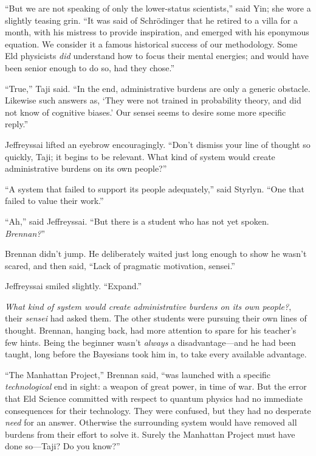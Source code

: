 {
 ``But we are not speaking of only the
lower-status scientists,'' said Yin; she wore a
slightly teasing grin. ``It was said of Schrödinger
that he retired to a villa for a month, with his mistress to provide
inspiration, and emerged with his eponymous equation. We consider it a
famous historical success of our methodology. Some Eld physicists
\textit{did} understand how to focus their mental energies; and would
have been senior enough to do so, had they chose.''}

{
 ``True,'' Taji said.
``In the end, administrative burdens are only a
generic obstacle. Likewise such answers as, `They were
not trained in probability theory, and did not know of cognitive
biases.' Our sensei seems to desire some more specific
reply.''}

{
 Jeffreyssai lifted an eyebrow encouragingly.
``Don't dismiss your line of thought
so quickly, Taji; it begins to be relevant. What kind of system would
create administrative burdens on its own people?''}

{
 ``A system that failed to support its people
adequately,'' said Styrlyn. ``One
that failed to value their work.''}

{
 ``Ah,'' said Jeffreyssai.
``But there is a student who has not yet spoken.
\textit{Brennan?}''}

{
 Brennan didn't jump. He deliberately waited just
long enough to show he wasn't scared, and then said,
``Lack of pragmatic motivation,
sensei.''}

{
 Jeffreyssai smiled slightly.
``Expand.''}

{
 \textit{What kind of system would create administrative burdens on
its own people?}, their \textit{sensei} had asked them. The other
students were pursuing their own lines of thought. Brennan, hanging
back, had more attention to spare for his teacher's few
hints. Being the beginner wasn't \textit{always} a
disadvantage---and he had been taught, long before the Bayesians took
him in, to take every available advantage.}

{
 ``The Manhattan Project,''
Brennan said, ``was launched with a specific
\textit{technological} end in sight: a weapon of great power, in time
of war. But the error that Eld Science committed with respect to
quantum physics had no immediate consequences for their technology.
They were confused, but they had no desperate \textit{need} for an
answer. Otherwise the surrounding system would have removed all burdens
from their effort to solve it. Surely the Manhattan Project must have
done so---Taji? Do you know?''}

